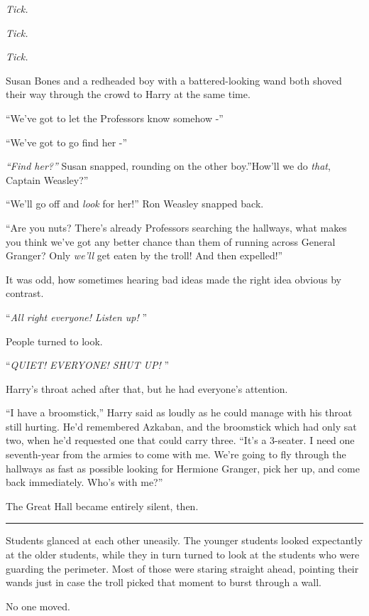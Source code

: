 \emph{Tick.}

\emph{Tick.}

\emph{Tick.}

Susan Bones and a redheaded boy with a battered-looking wand both shoved
their way through the crowd to Harry at the same time.

``We've got to let the Professors know somehow -''

``We've got to go find her -''

\emph{``Find her?''} Susan snapped, rounding on the other boy.''How'll
we do \emph{that}, Captain Weasley?''

``We'll go off and \emph{look} for her!'' Ron Weasley snapped back.

``Are you nuts? There's already Professors searching the hallways, what
makes you think we've got any better chance than them of running across
General Granger? Only \emph{we'll} get eaten by the troll! And then
expelled!''

It was odd, how sometimes hearing bad ideas made the right idea obvious
by contrast.

``\emph{All right everyone! Listen up!} ''

People turned to look.

``\emph{QUIET! EVERYONE! SHUT UP!} ''

Harry's throat ached after that, but he had everyone's attention.

``I have a broomstick,'' Harry said as loudly as he could manage with
his throat still hurting. He'd remembered Azkaban, and the broomstick
which had only sat two, when he'd requested one that could carry three.
``It's a 3-seater. I need one seventh-year from the armies to come with
me. We're going to fly through the hallways as fast as possible looking
for Hermione Granger, pick her up, and come back immediately. Who's with
me?''

The Great Hall became entirely silent, then.

\begin{center}\rule{3in}{0.4pt}\end{center}

Students glanced at each other uneasily. The younger students looked
expectantly at the older students, while they in turn turned to look at
the students who were guarding the perimeter. Most of those were staring
straight ahead, pointing their wands just in case the troll picked that
moment to burst through a wall.

No one moved.

